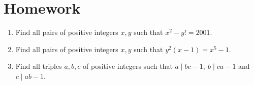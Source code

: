 \documentclass{article}
\begin{document}
\section{Homework}
\begin{enumerate}
  \item Find all pairs of positive integers $x,y$ such that $x^2-y!=2001$.
  \item Find all pairs of positive integers $x,y$ such that $y^2(x-1)=x^5-1$.
  \item Find all triples $a,b,c$ of positive integers such that $a\mid bc-1,\
    b\mid ca-1$ and $c\mid ab-1$.
\end{enumerate}
\end{document}
